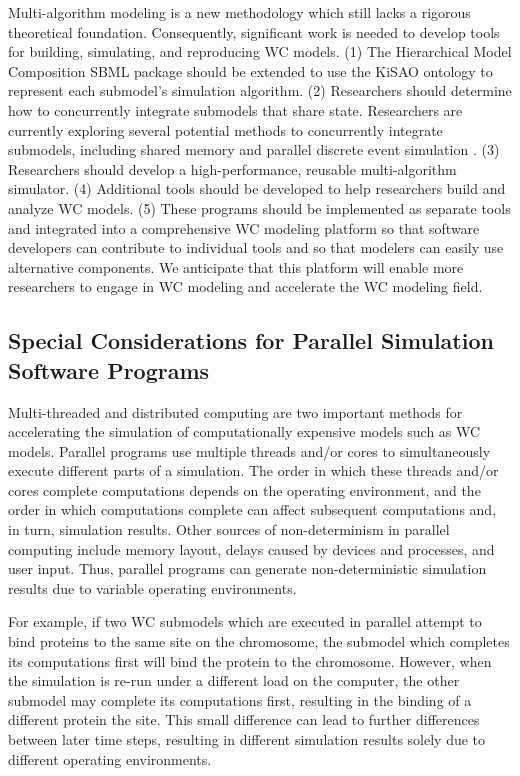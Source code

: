 \documentclass[journal,transmag,twoside]{IEEEtran}
\begin{document}
Multi-algorithm modeling is a new methodology which still lacks a rigorous theoretical foundation. Consequently, significant work is needed to develop tools for building, simulating, and reproducing WC models. (1) The Hierarchical Model Composition SBML package should be extended to use the KiSAO ontology \cite{courtot2011controlled} to represent each submodel's simulation algorithm. (2) Researchers should determine how to concurrently integrate submodels that share state. Researchers are currently exploring several potential methods to concurrently integrate submodels, including shared memory and parallel discrete event simulation \cite{Goldberg2016}. (3) Researchers should develop a high-performance, reusable multi-algorithm simulator. (4) Additional tools should be developed to help researchers build and analyze WC models. (5) These programs should be implemented as separate tools and integrated into a comprehensive WC modeling platform so that software developers can contribute to individual tools and so that modelers can easily use alternative components. We anticipate that this platform will enable more researchers to engage in WC modeling and accelerate the WC modeling field.

\subsection{Special Considerations for Parallel Simulation Software Programs}

Multi-threaded and distributed computing are two important methods for accelerating the simulation of computationally expensive models such as WC models. Parallel programs use multiple threads and/or cores to simultaneously execute different parts of a simulation. The order in which these threads and/or cores complete computations depends on the operating environment, and the order in which computations complete can affect subsequent computations and, in turn, simulation results. Other sources of non-determinism in parallel computing include memory layout, delays caused by devices and processes, and user input. Thus, parallel programs can generate non-deterministic simulation results due to variable operating environments.

For example, if two WC submodels which are executed in parallel attempt to bind proteins to the same site on the chromosome, the submodel which completes its computations first will bind the protein to the chromosome. However, when the simulation is re-run under a different load on the computer, the other submodel may complete its computations first, resulting in the binding of a different protein the site. This small difference can lead to further differences between later time steps, resulting in different simulation results solely due to different operating environments.
\end{document}
